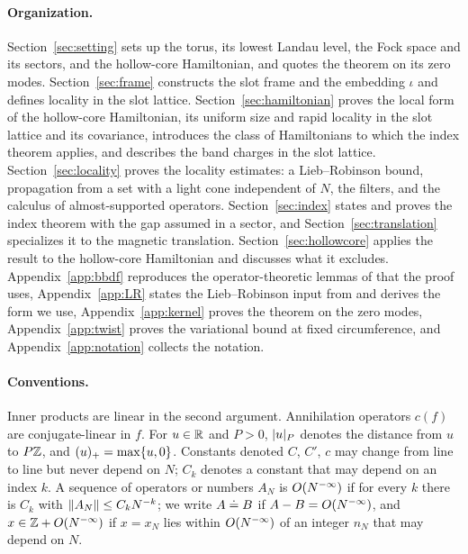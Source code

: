 \paragraph{Organization.}
Section~\ref{sec:setting} sets up the torus, its lowest Landau level, the Fock space and its sectors, and
the hollow-core Hamiltonian, and quotes the theorem on its zero modes. Section~\ref{sec:frame} constructs
the slot frame and the embedding $\iota$ and defines locality in the slot lattice. Section~\ref{sec:hamiltonian}
proves the local form of the hollow-core Hamiltonian, its uniform size and rapid locality in the slot
lattice and its covariance, introduces the class of Hamiltonians to which the index theorem applies, and
describes the band charges in the slot lattice. Section~\ref{sec:locality} proves the locality estimates: a
Lieb--Robinson bound, propagation from a set with a light cone independent of $N$, the filters, and the
calculus of almost-supported operators. Section~\ref{sec:index} states and proves the index theorem with the
gap assumed in a sector, and Section~\ref{sec:translation} specializes it to the magnetic translation.
Section~\ref{sec:hollowcore} applies the result to the hollow-core Hamiltonian and discusses what it
excludes. Appendix~\ref{app:bbdf} reproduces the operator-theoretic lemmas of \cite{BBDF21} that the proof
uses, Appendix~\ref{app:LR} states the Lieb--Robinson input from \cite{NSY18} and derives the form we use,
Appendix~\ref{app:kernel} proves the theorem on the zero modes, Appendix~\ref{app:twist} proves the variational bound at
fixed circumference, and Appendix~\ref{app:notation} collects the notation.

\paragraph{Conventions.}
Inner products are linear in the second argument. Annihilation operators $c(f)$ are conjugate-linear in
$f$. For $u\in\mathbb{R}$ and $P>0$, $\lvert u\rvert_P$ denotes the distance from $u$ to $P\mathbb{Z}$, and $(u)_{+}=\max\{u,0\}$.
Constants denoted $C$, $C'$, $c$ may change from line to line but never depend on $N$; $C_k$ denotes a
constant that may depend on an index $k$. A sequence of operators or numbers $A_N$ is $O(N^{-\infty})$ if for every
$k$ there is $C_k$ with $\lVert A_N\rVert\le C_kN^{-k}$; we write $A\doteq B$ if $A-B=O(N^{-\infty})$, and $x\in\mathbb{Z}+O(N^{-\infty})$ if
$x=x_N$ lies within $O(N^{-\infty})$ of an integer $n_N$ that may depend on $N$.
